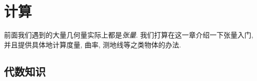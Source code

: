 \chapter{计算}
前面我们遇到的大量几何量实际上都是\textit{张量}.
我们打算在这一章介绍一下张量入门, 并且提供具体地计算度量, 曲率, 测地线等之类物体的办法.

\section{代数知识}